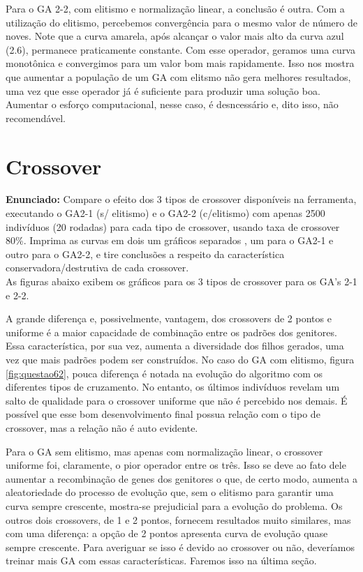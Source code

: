 \documentclass[12pt]{article}
\begin{document}
Para o GA 2-2, com elitismo e normalização linear, a conclusão é outra. Com a utilização do elitismo, percebemos convergência para o mesmo valor de número de noves. Note que a curva amarela, após alcançar o valor mais alto da curva azul (2.6), permanece praticamente constante. Com esse operador, geramos uma curva monotônica e convergimos para um valor bom mais rapidamente. Isso nos mostra que aumentar a população de um GA com elitsmo não gera melhores resultados, uma vez que esse operador já é suficiente para produzir uma solução boa. Aumentar o esforço computacional, nesse caso, é desncessário e, dito isso, não recomendável.

\section{Crossover}
\textbf{Enunciado:}
Compare o efeito dos 3 tipos de crossover disponíveis na ferramenta, executando o GA2-1 (s/ elitismo) e o GA2-2 (c/elitismo) com apenas 2500 indivíduos (20 rodadas) para cada tipo de crossover, usando taxa de crossover 80\%. Imprima as curvas em dois um gráficos separados , um para o GA2-1 e outro para o GA2-2, e tire conclusões a respeito da característica conservadora/destrutiva de cada crossover.\\

As figuras abaixo exibem os gráficos para os 3 tipos de crossover para os GA's 2-1 e 2-2.

A grande diferença e, possivelmente, vantagem, dos crossovers de 2 pontos e uniforme é a maior capacidade de combinação entre os padrões dos genitores. Essa característica, por sua vez, aumenta a diversidade dos filhos gerados, uma vez que mais padrões podem ser construídos. No caso do GA com elitismo, figura \ref{fig:questao62}, pouca diferença é notada na evolução do algoritmo com os diferentes tipos de cruzamento. No entanto, os últimos indivíduos revelam um salto de qualidade para o crossover uniforme que não é percebido nos demais. É possível que esse bom desenvolvimento final possua relação com o tipo de crossover, mas a relação não é auto evidente.

Para o GA sem elitismo, mas apenas com normalização linear, o crossover uniforme foi, claramente, o pior operador entre os três. Isso se deve ao fato dele aumentar a recombinação de genes dos genitores o que, de certo modo, aumenta a aleatoriedade do processo de evolução que, sem o elitismo para garantir uma curva sempre crescente, mostra-se prejudicial para a evolução do problema. Os outros dois crossovers, de 1 e 2 pontos, fornecem resultados muito similares, mas com uma diferença: a opção de 2 pontos apresenta curva de evolução quase sempre crescente. Para averiguar se isso é devido ao crossover ou não, deveríamos treinar mais GA com essas características. Faremos isso na última seção.
\end{document}
